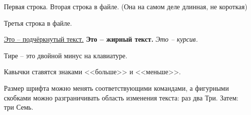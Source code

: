 \documentclass[a4paper, 12pt]{article}
\begin{document}
Первая строка.
Вторая строка в файле. (Она на самом деле длинная, не короткая)

Третья строка в файле.

\underline{Это -- подчёркнутый текст.} \textbf{Это -- жирный текст.} \textit{Это -- курсив.}

Тире -- это двойной минус на клавиатуре.

Кавычки ставятся знаками <<больше>> и <<меньше>>.

Размер шрифта можно менять соответствующими командами, а фигурными скобками можно разграничивать область изменения текста: {\LARGE раз два Три.} Затем: {\tiny три Семь.}

\end{document}
